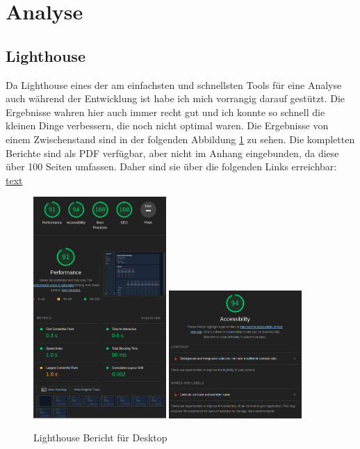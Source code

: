 \section{Analyse}

\subsection{Lighthouse}

Da Lighthouse eines der am einfachsten und schnellsten Tools für eine Analyse auch während der Entwicklung ist habe ich mich vorrangig darauf gestützt. Die Ergebnisse wahren hier auch immer recht gut und ich konnte so schnell die kleinen Dinge verbessern, die noch nicht optimal waren. Die Ergebnisse von einem Zwischenstand sind in der folgenden Abbildung \ref{fig:lighthouse_desktop_1} zu sehen. Die kompletten Berichte sind als PDF verfügbar, aber nicht im Anhang eingebunden, da diese über 100 Seiten umfassen. Daher sind sie über die folgenden Links erreichbar: \href{URL}{text}

\begin{figure}[th]
    \centering
    \includegraphics[width=0.45\textwidth]{Figures/lighthouse_desktop_1.png}
    \includegraphics[width=0.45\textwidth]{Figures/lighthouse_desktop_2.png}
    \decoRule
    \caption[Turbomeet Lighthouse Bericht Desktop]{Lighthouse Bericht für Desktop}
    \label{fig:lighthouse_desktop_1}
\end{figure}

